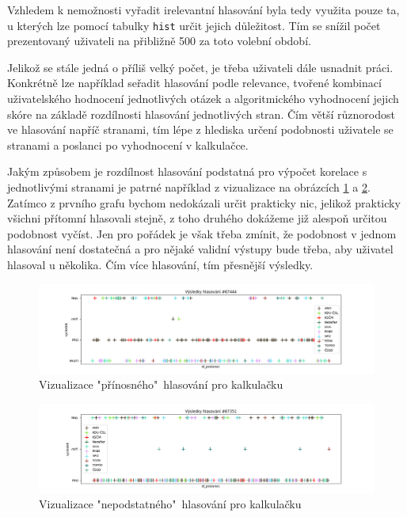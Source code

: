 \par Vzhledem k nemožnosti vyřadit irelevantní hlasování byla tedy využita pouze ta, u kterých lze pomocí tabulky \texttt{hist} určit jejich důležitost. Tím se snížil počet prezentovaný uživateli na přibližně 500 za toto volební období.\\

\par Jelikož se stále jedná o příliš velký počet, je třeba uživateli dále usnadnit práci. Konkrétně lze například seřadit hlasování podle relevance, tvořené kombinací uživatelského hodnocení jednotlivých otázek a algoritmického vyhodnocení jejich skóre na základě rozdílnosti hlasování jednotlivých stran. Čím větší různorodost ve hlasování napříč stranami, tím lépe z hlediska určení podobnosti uživatele se stranami a poslanci po vyhodnocení v kalkulačce. \\

\par Jakým způsobem je rozdílnost hlasování podstatná pro výpočet korelace s jednotlivými stranami je patrné například z vizualizace na obrázcích \ref{fig:analyza-rozdilne} a \ref{fig:analyza-stejne}. Zatímco z prvního grafu bychom nedokázali určit prakticky nic, jelikož prakticky všichni přítomní hlasovali stejně, z toho druhého dokážeme již alespoň určitou podobnost vyčíst. Jen pro pořádek je však třeba zmínit, že podobnost v jednom hlasování není dostatečná a pro nějaké validní výstupy bude třeba, aby uživatel hlasoval u několika. Čím více hlasování, tím přesnější výsledky.

\begin{figure}
    \centering
    \includegraphics[width=1\textwidth]{obrazky-figures/analyza_hl_rozdilne.png}
    \caption{Vizualizace "přínosného"\ hlasování pro kalkulačku}
    \label{fig:analyza-rozdilne}
\end{figure}

\begin{figure}
    \centering
    \includegraphics[width=1\textwidth]{obrazky-figures/analyza_hl_stejne.png}
    \caption{Vizualizace "nepodstatného"\ hlasování pro kalkulačku}
    \label{fig:analyza-stejne}
\end{figure}

